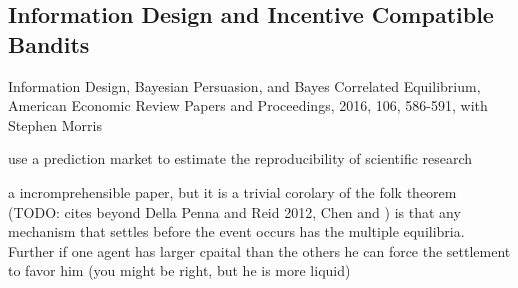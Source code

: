 \subsection{Information Design and Incentive Compatible Bandits}

Information Design, Bayesian Persuasion, and Bayes Correlated Equilibrium,  American Economic Review Papers and Proceedings, 2016, 106, 586-591, with Stephen Morris

\cite{mansour2015bayesian}



\cite{dreber2015using}
use a prediction market to estimate the reproducibility of scientific research


a incromprehensible paper, but it is a trivial corolary of the folk theorem (TODO: cites beyond Della Penna and Reid 2012, Chen and ) is that any mechanism that settles before the event occurs has the multiple equilibria. Further if one agent has larger cpaital than the others he can force the settlement to favor him (you might be right, but he is more liquid) %
